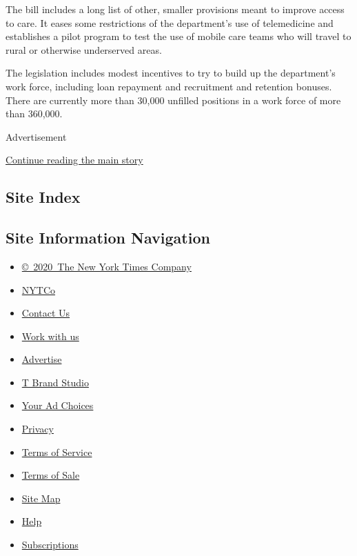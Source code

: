 The bill includes a long list of other, smaller provisions meant to
improve access to care. It eases some restrictions of the department's
use of telemedicine and establishes a pilot program to test the use of
mobile care teams who will travel to rural or otherwise underserved
areas.

The legislation includes modest incentives to try to build up the
department's work force, including loan repayment and recruitment and
retention bonuses. There are currently more than 30,000 unfilled
positions in a work force of more than 360,000.

Advertisement

\protect\hyperlink{after-bottom}{Continue reading the main story}

\hypertarget{site-index}{%
\subsection{Site Index}\label{site-index}}

\hypertarget{site-information-navigation}{%
\subsection{Site Information
Navigation}\label{site-information-navigation}}

\begin{itemize}
\tightlist
\item
  \href{https://help.nytimes3xbfgragh.onion/hc/en-us/articles/115014792127-Copyright-notice}{©~2020~The
  New York Times Company}
\end{itemize}

\begin{itemize}
\tightlist
\item
  \href{https://www.nytco.com/}{NYTCo}
\item
  \href{https://help.nytimes3xbfgragh.onion/hc/en-us/articles/115015385887-Contact-Us}{Contact
  Us}
\item
  \href{https://www.nytco.com/careers/}{Work with us}
\item
  \href{https://nytmediakit.com/}{Advertise}
\item
  \href{http://www.tbrandstudio.com/}{T Brand Studio}
\item
  \href{https://www.nytimes3xbfgragh.onion/privacy/cookie-policy\#how-do-i-manage-trackers}{Your
  Ad Choices}
\item
  \href{https://www.nytimes3xbfgragh.onion/privacy}{Privacy}
\item
  \href{https://help.nytimes3xbfgragh.onion/hc/en-us/articles/115014893428-Terms-of-service}{Terms
  of Service}
\item
  \href{https://help.nytimes3xbfgragh.onion/hc/en-us/articles/115014893968-Terms-of-sale}{Terms
  of Sale}
\item
  \href{https://spiderbites.nytimes3xbfgragh.onion}{Site Map}
\item
  \href{https://help.nytimes3xbfgragh.onion/hc/en-us}{Help}
\item
  \href{https://www.nytimes3xbfgragh.onion/subscription?campaignId=37WXW}{Subscriptions}
\end{itemize}
